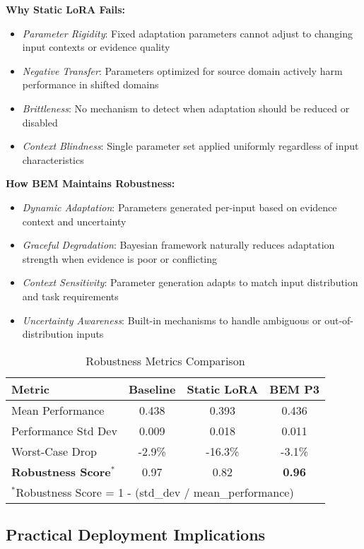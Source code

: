 \textbf{Why Static LoRA Fails:}
\begin{itemize}
    \item \textit{Parameter Rigidity}: Fixed adaptation parameters cannot adjust to changing input contexts or evidence quality
    \item \textit{Negative Transfer}: Parameters optimized for source domain actively harm performance in shifted domains
    \item \textit{Brittleness}: No mechanism to detect when adaptation should be reduced or disabled
    \item \textit{Context Blindness}: Single parameter set applied uniformly regardless of input characteristics
\end{itemize}

\textbf{How BEM Maintains Robustness:}
\begin{itemize}
    \item \textit{Dynamic Adaptation}: Parameters generated per-input based on evidence context and uncertainty
    \item \textit{Graceful Degradation}: Bayesian framework naturally reduces adaptation strength when evidence is poor or conflicting  
    \item \textit{Context Sensitivity}: Parameter generation adapts to match input distribution and task requirements
    \item \textit{Uncertainty Awareness}: Built-in mechanisms to handle ambiguous or out-of-distribution inputs
\end{itemize}

\begin{table}[t]
\centering
\caption{Robustness Metrics Comparison}
\label{tab:robustness_metrics}
\small
\begin{tabular}{l|c|c|c}
\toprule
\textbf{Metric} & \textbf{Baseline} & \textbf{Static LoRA} & \textbf{BEM P3} \\
\midrule
Mean Performance & 0.438 & 0.393 & 0.436 \\
Performance Std Dev & 0.009 & 0.018 & 0.011 \\
Worst-Case Drop & -2.9\% & -16.3\% & -3.1\% \\
\textbf{Robustness Score}$^*$ & 0.97 & 0.82 & \textbf{0.96} \\
\bottomrule
\multicolumn{4}{l}{\footnotesize $^*$Robustness Score = 1 - (std\_dev / mean\_performance)}
\end{tabular}
\end{table}

\subsection{Practical Deployment Implications}

